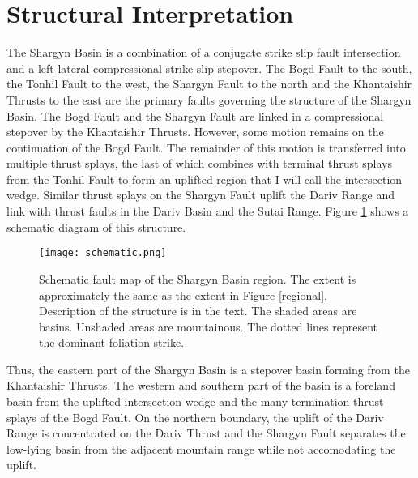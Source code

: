 \section{Structural Interpretation}
The Shargyn Basin is a combination of a conjugate strike slip fault intersection and a left-lateral compressional strike-slip stepover. The Bogd Fault to the south, the Tonhil Fault to the west, the Shargyn Fault to the north and the Khantaishir Thrusts to the east are the primary faults governing the structure of the Shargyn Basin. The Bogd Fault and the Shargyn Fault are linked in a compressional stepover by the Khantaishir Thrusts. However, some motion remains on the continuation of the Bogd Fault. The remainder of this motion is transferred into multiple thrust splays, the last of which combines with terminal thrust splays from the Tonhil Fault to form an uplifted region that I will call the intersection wedge. Similar thrust splays on the Shargyn Fault uplift the Dariv Range and link with thrust faults in the Dariv Basin and the Sutai Range. Figure \ref{schematic} shows a schematic diagram of this structure.

\begin{figure}[h!]
  \centering
  \texttt{[image: schematic.png]}
  \caption{Schematic fault map of the Shargyn Basin region. The extent is approximately the same as the extent in Figure \ref{regional}. Description of the structure is in the text. The shaded areas are basins. Unshaded areas are mountainous. The dotted lines represent the dominant foliation strike. }
  \label{schematic}
\end{figure}

	Thus, the eastern part of the Shargyn Basin is a stepover basin forming from the Khantaishir Thrusts. The western and southern part of the basin is a foreland basin from the uplifted intersection wedge and the many termination thrust splays of the Bogd Fault. On the northern boundary, the uplift of the Dariv Range is concentrated on the Dariv Thrust and the Shargyn Fault separates the low-lying basin from the adjacent mountain range while not accomodating the uplift.

